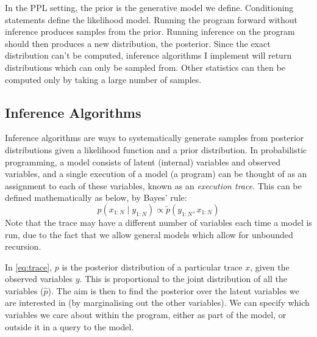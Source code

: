 % 
In the PPL setting, the prior is the generative model we define. Conditioning statements define the likelihood model. Running the program forward without inference produces samples from the prior. Running inference on the program should then produces a new distribution, the posterior. Since the exact distribution can't be computed, inference algorithms I implement will return distributions which can only be sampled from. Other statistics can then be computed only by taking a large number of samples.
	
\subsection{Inference Algorithms}
			

Inference algorithms are ways to systematically generate samples from posterior distributions given a likelihood function and a prior distribution. In probabilistic programming, a model consists of latent (internal) variables and observed variables, and a single execution of a model (a program) can be thought of as an assignment to each of these variables, known as an \textit{execution trace}. This can be defined mathematically as below, by Bayes' rule:
% 
\begin{equation} \label{eq:trace}
	p(x_{1:N}\mid y_{1:N})\propto \tilde{p}(y_{1:N},x_{1:N})
\end{equation}
% 
Note that the trace may have a different number of variables each time a model is run, due to the fact that we allow general models which allow for unbounded recursion. 

In \eqref{eq:trace}, $p$ is the posterior distribution of a particular trace $x$, given the observed variables $y$. This is proportional to the joint distribution of all the variables ($\hat{p}$). The aim is then to find the posterior over the latent variables we are interested in (by marginalising out the other variables). We can specify which variables we care about within the program, either as part of the model, or outside it in a query to the model.

